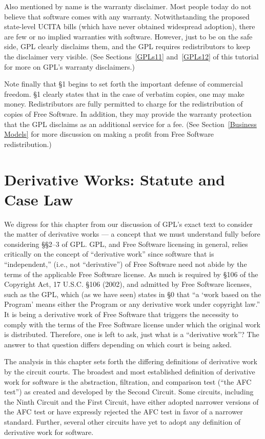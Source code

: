 \documentclass[11pt, letterpaper]{book}
\begin{document}
Also mentioned by name is the warranty disclaimer. Most people today do
not believe that software comes with any warranty. Notwithstanding the
proposed state-level UCITA bills (which have never obtained widespread
adoption), there are few or no implied warranties with software.
However, just to be on the safe side, GPL clearly disclaims them, and the
GPL requires redistributors to keep the disclaimer very visible. (See
Sections~\ref{GPLs11} and~\ref{GPLs12} of this tutorial for more on GPL's
warranty disclaimers.)

Note finally that \S 1 begins to set forth the important defense of
commercial freedom. \S 1 clearly states that in the case of verbatim
copies, one may make money. Redistributors are fully permitted to charge
for the redistribution of copies of Free Software. In addition, they may
provide the warranty protection that the GPL disclaims as an additional
service for a fee. (See Section~\ref{Business Models} for more discussion
on making a profit from Free Software redistribution.)


\chapter{Derivative Works: Statute and Case Law}

We digress for this chapter from our discussion of GPL's exact text to
consider the matter of derivative works --- a concept that we must
understand fully before considering \S\S 2--3 of GPL\@. GPL, and Free
Software licensing in general, relies critically on the concept of
``derivative work'' since software that is ``independent,'' (i.e., not
``derivative'') of Free Software need not abide by the terms of the
applicable Free Software license. As much is required by \S 106 of the
Copyright Act, 17 U.S.C. \S 106 (2002), and admitted by Free Software
licenses, such as the GPL, which (as we have seen) states in \S 0 that ``a
`work based on the Program' means either the Program or any derivative
work under copyright law.'' It is being a derivative work of Free Software
that triggers the necessity to comply with the terms of the Free Software
license under which the original work is distributed. Therefore, one is
left to ask, just what is a ``derivative work''? The answer to that
question differs depending on which court is being asked.

The analysis in this chapter sets forth the differing definitions of
derivative work by the circuit courts. The broadest and most
established definition of derivative work for software is the
abstraction, filtration, and comparison test (``the AFC test'') as
created and developed by the Second Circuit. Some circuits, including
the Ninth Circuit and the First Circuit, have either adopted narrower
versions of the AFC test or have expressly rejected the AFC test in
favor of a narrower standard. Further, several other circuits have yet
to adopt any definition of derivative work for software.
\end{document}
